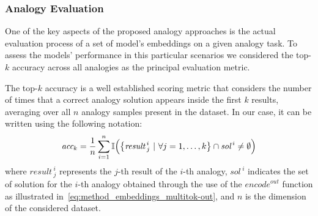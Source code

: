 \subsubsection{Analogy Evaluation}\label{subsubsec:method_embeddings_evaluation}

One of the key aspects of the proposed analogy approaches is the actual evaluation process of a set of model's embeddings on a given analogy task.
To assess the models' performance in this particular scenarios we considered the top-$k$ accuracy across all analogies as the principal evaluation metric.

The top-$k$ accuracy is a well established scoring metric that considers the number of times that a correct analogy solution appears inside the first $k$ results, averaging over all $n$ analogy samples present in the dataset.
In our case, it can be written using the following notation:
\begin{equation}
    \label{eq:method_embeddings_topk-accuracy}
    \textit{acc}_k = \frac{1}{n} \sum_{i=1}^{n} \mathbb{I}\Bigl( {\left\{ {\textit{result}\,}^i_j \ |\ \forall j = 1,\ldots,k \right\}} \cap {\textit{sol}\,}^i \neq \emptyset \Bigr)
\end{equation}
where ${\textit{result}\,}^i_j$ represents the $j$-th result of the $i$-th analogy, ${\textit{sol}\,}^i$ indicates the set of solution for the $i$-th analogy obtained through the use of the ${\textit{encode}}^{out}$ function as illustrated in~\cref{eq:method_embeddings_multitok-out}, and $n$ is the dimension of the considered dataset.




